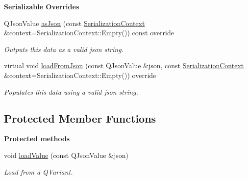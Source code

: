 \begin{Indent}\textbf{ Serializable Overrides}\par
\begin{DoxyCompactItemize}
\item 
\mbox{\label{structrev_1_1_uniform_a482af779d03eb38aa5b6cde788dd0e35}} 
Q\+Json\+Value \mbox{\hyperlink{structrev_1_1_uniform_a482af779d03eb38aa5b6cde788dd0e35}{as\+Json}} (const \mbox{\hyperlink{structrev_1_1_serialization_context}{Serialization\+Context}} \&context=Serialization\+Context\+::\+Empty()) const override
\begin{DoxyCompactList}\small\item\em Outputs this data as a valid json string. \end{DoxyCompactList}\item 
\mbox{\label{structrev_1_1_uniform_a1be2b73e53c8745b7388d85235832369}} 
virtual void \mbox{\hyperlink{structrev_1_1_uniform_a1be2b73e53c8745b7388d85235832369}{load\+From\+Json}} (const Q\+Json\+Value \&json, const \mbox{\hyperlink{structrev_1_1_serialization_context}{Serialization\+Context}} \&context=Serialization\+Context\+::\+Empty()) override
\begin{DoxyCompactList}\small\item\em Populates this data using a valid json string. \end{DoxyCompactList}\end{DoxyCompactItemize}
\end{Indent}
\subsection*{Protected Member Functions}
\begin{Indent}\textbf{ Protected methods}\par
\begin{DoxyCompactItemize}
\item 
\mbox{\label{structrev_1_1_uniform_aea123281c5ef79f08d9da17fe6fdb79b}} 
void \mbox{\hyperlink{structrev_1_1_uniform_aea123281c5ef79f08d9da17fe6fdb79b}{load\+Value}} (const Q\+Json\+Value \&json)
\begin{DoxyCompactList}\small\item\em Load from a Q\+Variant. \end{DoxyCompactList}\end{DoxyCompactItemize}
\end{Indent}
